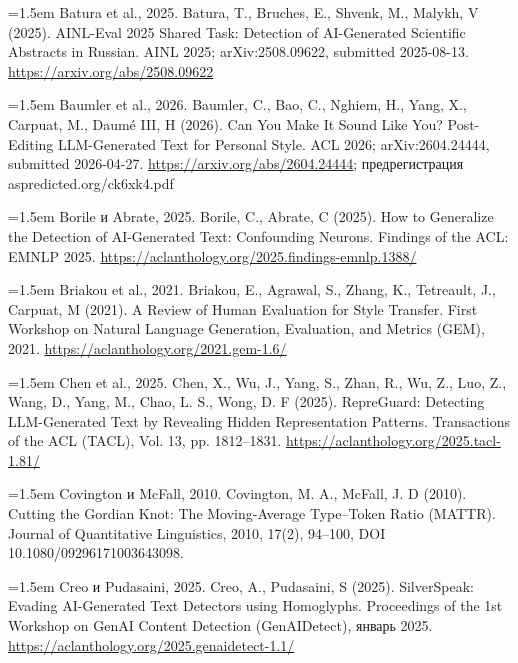 \documentclass[11pt,a4paper]{article}
\renewcommand{\_}{\textunderscore\allowbreak}
\begin{document}
\noindent\hangindent=1.5em Batura et al., 2025. Batura, T., Bruches, E., Shvenk, M., Malykh, V (2025). AINL-Eval 2025 Shared Task: Detection of AI-Generated Scientific Abstracts in Russian. AINL 2025; arXiv:2508.09622, submitted 2025-08-13. \url{https://arxiv.org/abs/2508.09622}\par\smallskip

\noindent\hangindent=1.5em Baumler et al., 2026. Baumler, C., Bao, C., Nghiem, H., Yang, X., Carpuat, M., Daum\'e III, H (2026). Can You Make It Sound Like You? Post-Editing LLM-Generated Text for Personal Style. ACL 2026; arXiv:2604.24444, submitted 2026-04-27. \url{https://arxiv.org/abs/2604.24444}; предрегистрация aspredicted.org/ck6xk4.pdf\par\smallskip

\noindent\hangindent=1.5em Borile и Abrate, 2025. Borile, C., Abrate, C (2025). How to Generalize the Detection of AI-Generated Text: Confounding Neurons. Findings of the ACL: EMNLP 2025. \url{https://aclanthology.org/2025.findings-emnlp.1388/}\par\smallskip

\noindent\hangindent=1.5em Briakou et al., 2021. Briakou, E., Agrawal, S., Zhang, K., Tetreault, J., Carpuat, M (2021). A Review of Human Evaluation for Style Transfer. First Workshop on Natural Language Generation, Evaluation, and Metrics (GEM), 2021. \url{https://aclanthology.org/2021.gem-1.6/}\par\smallskip

\noindent\hangindent=1.5em Chen et al., 2025. Chen, X., Wu, J., Yang, S., Zhan, R., Wu, Z., Luo, Z., Wang, D., Yang, M., Chao, L. S., Wong, D. F (2025). RepreGuard: Detecting LLM-Generated Text by Revealing Hidden Representation Patterns. Transactions of the ACL (TACL), Vol. 13, pp. 1812–1831. \url{https://aclanthology.org/2025.tacl-1.81/}\par\smallskip

\noindent\hangindent=1.5em Covington и McFall, 2010. Covington, M. A., McFall, J. D (2010). Cutting the Gordian Knot: The Moving-Average Type–Token Ratio (MATTR). Journal of Quantitative Linguistics, 2010, 17(2), 94–100, DOI 10.1080/09296171003643098.\par\smallskip

\noindent\hangindent=1.5em Creo и Pudasaini, 2025. Creo, A., Pudasaini, S (2025). SilverSpeak: Evading AI-Generated Text Detectors using Homoglyphs. Proceedings of the 1st Workshop on GenAI Content Detection (GenAIDetect), январь 2025. \url{https://aclanthology.org/2025.genaidetect-1.1/}\par\smallskip
\end{document}
